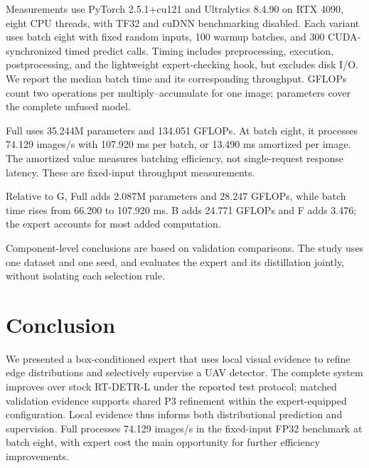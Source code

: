 Measurements use PyTorch 2.5.1+cu121 and Ultralytics 8.4.90 on RTX 4090, eight CPU threads, with TF32 and cuDNN benchmarking disabled. Each variant uses batch eight with fixed random inputs, 100 warmup batches, and 300 CUDA-synchronized timed predict calls. Timing includes preprocessing, execution, postprocessing, and the lightweight expert-checking hook, but excludes disk I/O. We report the median batch time and its corresponding throughput. GFLOPs count two operations per multiply--accumulate for one image; parameters cover the complete unfused model.


Full uses 35.244M parameters and 134.051 GFLOPs. At batch eight, it processes 74.129 images/s with 107.920 ms per batch, or 13.490 ms amortized per image. The amortized value measures batching efficiency, not single-request response latency. These are fixed-input throughput measurements.


\newpage

Relative to G, Full adds 2.087M parameters and 28.247 GFLOPs, while batch time rises from 66.200 to 107.920 ms. B adds 24.771 GFLOPs and F adds 3.476; the expert accounts for most added computation.


Component-level conclusions are based on validation comparisons. The study uses one dataset and one seed, and evaluates the expert and its distillation jointly, without isolating each selection rule.


\section{Conclusion}

We presented a box-conditioned expert that uses local visual evidence to refine edge distributions and selectively supervise a UAV detector. The complete system improves over stock RT-DETR-L under the reported test protocol; matched validation evidence supports shared P3 refinement within the expert-equipped configuration. Local evidence thus informs both distributional prediction and supervision. Full processes 74.129 images/s in the fixed-input FP32 benchmark at batch eight, with expert cost the main opportunity for further efficiency improvements.


